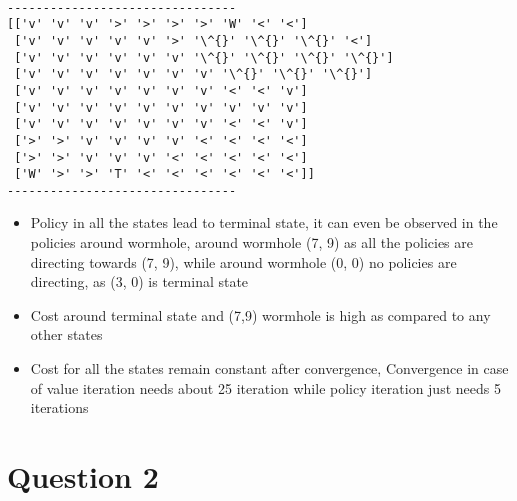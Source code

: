 \documentclass[11pt]{article}
\providecommand{\tightlist}{%
      \setlength{\itemsep}{0pt}\setlength{\parskip}{0pt}}
\begin{document}
    \begin{center}
    \end{center}
    { \hspace*{\fill} \\}
    
    \begin{Verbatim}[commandchars=\\\{\}]
--------------------------------
[['v' 'v' 'v' '>' '>' '>' '>' 'W' '<' '<']
 ['v' 'v' 'v' 'v' 'v' '>' '\^{}' '\^{}' '\^{}' '<']
 ['v' 'v' 'v' 'v' 'v' 'v' '\^{}' '\^{}' '\^{}' '\^{}']
 ['v' 'v' 'v' 'v' 'v' 'v' 'v' '\^{}' '\^{}' '\^{}']
 ['v' 'v' 'v' 'v' 'v' 'v' 'v' '<' '<' 'v']
 ['v' 'v' 'v' 'v' 'v' 'v' 'v' 'v' 'v' 'v']
 ['v' 'v' 'v' 'v' 'v' 'v' 'v' '<' '<' 'v']
 ['>' '>' 'v' 'v' 'v' 'v' '<' '<' '<' '<']
 ['>' '>' 'v' 'v' 'v' '<' '<' '<' '<' '<']
 ['W' '>' '>' 'T' '<' '<' '<' '<' '<' '<']]
--------------------------------

    \end{Verbatim}

    \begin{itemize}
\tightlist
\item
  Policy in all the states lead to terminal state, it can even be
  observed in the policies around wormhole, around wormhole (7, 9) as
  all the policies are directing towards (7, 9), while around wormhole
  (0, 0) no policies are directing, as (3, 0) is terminal state
\item
  Cost around terminal state and (7,9) wormhole is high as compared to
  any other states
\item
  Cost for all the states remain constant after convergence, Convergence
  in case of value iteration needs about 25 iteration while policy
  iteration just needs 5 iterations
\end{itemize}

    

    \section{Question 2}\label{question-2}
\end{document}

